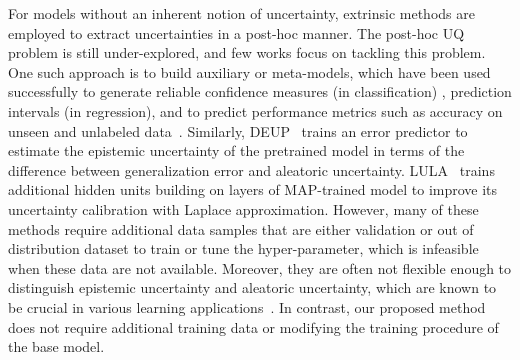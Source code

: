 For models without an inherent notion of uncertainty, extrinsic methods are employed to extract uncertainties in a post-hoc manner. The post-hoc UQ problem is still under-explored, and few works focus on tackling this problem. %
One such approach is to build auxiliary or meta-models, which have been used successfully to generate reliable confidence measures (in classification) \citep{chen2019confidence}, prediction intervals (in regression), and to predict performance metrics such as accuracy on unseen and unlabeled data~\citep{elder2020learning}. Similarly, DEUP~\citep{jain2021deup} trains an error predictor to estimate the epistemic uncertainty of the pretrained model in terms of the difference between generalization error and aleatoric uncertainty. LULA~\citep{kristiadi2021learnable} trains additional hidden units building on layers of MAP-trained model to improve its uncertainty calibration with Laplace approximation. However, many of these methods require additional data samples that are either validation or out of distribution dataset to train or tune the hyper-parameter, which is infeasible when these data are not available. Moreover, they are often not flexible enough to distinguish epistemic uncertainty and aleatoric uncertainty, which are known to be crucial in various learning applications~\citep{hullermeier2021aleatoric}. In contrast, our proposed method does not require additional training data or modifying the training procedure of the base model.  


